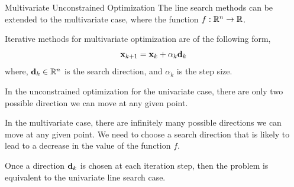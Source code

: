 \documentclass[aspectratio=169]{beamer}
\def\mf{\ensuremath\mathbf}
\def\mb{\ensuremath\mathbb}
\def\R{\ensuremath\mb{R}}
\begin{document}
\begin{frame}{Multivariate Unconstrained Optimization}
  The line search methods can be extended to the multivariate case, where the function $f: \R^n \to \R$.
  \vspace{0.2cm}

  Iterative methods for multivariate optimization are of the following form,
  \[ \mf{x}_{k+1} = \mf{x}_{k} + \alpha_k \mf{d}_{k} \]
  where, $\mf{d}_k \in \mb{R}^n$ is the search direction, and $\alpha_k$ is the step size.
  \vspace{0.2cm}

  In the unconstrained optimization for the univariate case, there are only two possible direction we can move at any given point.
  \vspace{0.2cm}

  In the multivariate case, there are infinitely many possible directions we can move at any given point. We need to choose a search direction that is likely to lead to a decrease in the value of the function $f$. 
  \vspace{0.2cm}

  Once a direction $\mf{d}_k$ is chosen at each iteration step, then the problem is equivalent to the univariate line search case.
\end{frame}
\end{document}
